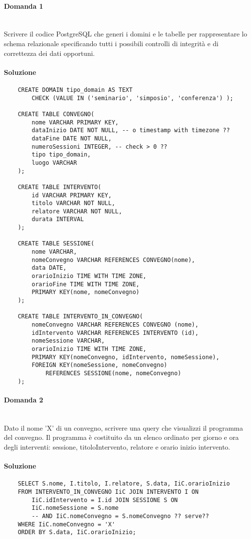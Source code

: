\documentclass[a4paper, 10pt, titlepage]{article}
\begin{document}
\paragraph{Domanda 1}\dotfill
\\Scrivere il codice PostgreSQL che generi i domini e le tabelle per rappresentare lo schema relazionale specificando tutti i possibili controlli di integrità e di correttezza dei dati opportuni.

\paragraph{Soluzione}\dotfill
\begin{lstlisting}
	CREATE DOMAIN tipo_domain AS TEXT
		CHECK (VALUE IN ('seminario', 'simposio', 'conferenza') );
		
	CREATE TABLE CONVEGNO(
		nome VARCHAR PRIMARY KEY,
		dataInizio DATE NOT NULL, -- o timestamp with timezone ??
		dataFine DATE NOT NULL,
		numeroSessioni INTEGER,	-- check > 0 ??
		tipo tipo_domain,
		luogo VARCHAR
	);
	
	CREATE TABLE INTERVENTO(
		id VARCHAR PRIMARY KEY,
		titolo VARCHAR NOT NULL,
		relatore VARCHAR NOT NULL,
		durata INTERVAL
	);
	
	CREATE TABLE SESSIONE(
		nome VARCHAR,
		nomeConvegno VARCHAR REFERENCES CONVEGNO(nome),
		data DATE,
		orarioInizio TIME WITH TIME ZONE,
		orarioFine TIME WITH TIME ZONE,
		PRIMARY KEY(nome, nomeConvegno)
	);
	
	CREATE TABLE INTERVENTO_IN_CONVEGNO(
		nomeConvegno VARCHAR REFERENCES CONVEGNO (nome),
  		idIntervento VARCHAR REFERENCES INTERVENTO (id),
  		nomeSessione VARCHAR,
  		orarioInizio TIME WITH TIME ZONE,
  		PRIMARY KEY(nomeConvegno, idIntervento, nomeSessione),
  		FOREIGN KEY(nomeSessione, nomeConvegno)
    		REFERENCES SESSIONE(nome, nomeConvegno)
	);
\end{lstlisting}

\paragraph{Domanda 2}\dotfill
\\Dato il nome 'X' di un convegno, scrivere una query che visualizzi il programma del convegno. Il programma è costituito da un elenco ordinato per giorno e ora degli interventi: sessione, titoloIntervento, relatore e orario inizio intervento.

\paragraph{Soluzione}\dotfill
\begin{lstlisting}
	SELECT S.nome, I.titolo, I.relatore, S.data, IiC.orarioInizio
	FROM INTERVENTO_IN_CONVEGNO IiC JOIN INTERVENTO I ON
		IiC.idIntervento = I.id JOIN SESSIONE S ON 
		IiC.nomeSessione = S.nome 
		-- AND IiC.nomeConvegno = S.nomeConvegno ?? serve??
	WHERE IiC.nomeConvegno = 'X'
	ORDER BY S.data, IiC.orarioInizio;
\end{lstlisting}
\end{document}
